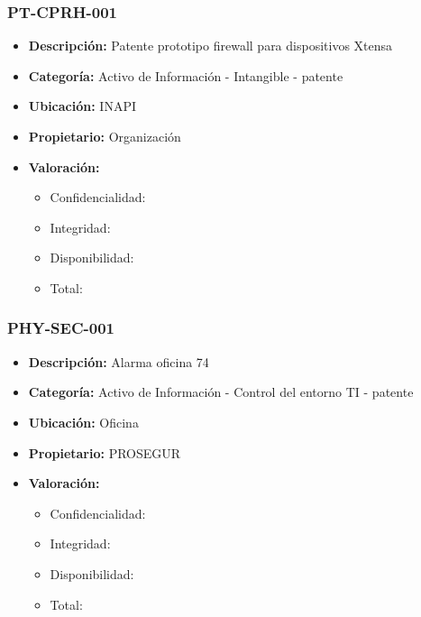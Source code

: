 \documentclass[11pt]{utalcaDoc}
\begin{document}
\subsubsection{PT-CPRH-001}
\begin{itemize}
    \item {\textbf{Descripción:}   Patente prototipo firewall para dispositivos Xtensa }
    \item {\textbf{Categoría:}     Activo de Información - Intangible - patente}
    \item {\textbf{Ubicación:}     INAPI }
    \item {\textbf{Propietario:}   Organización } %
    \item {\textbf{Valoración:}
          \begin{itemize}
              \item Confidencialidad:
              \item Integridad:
              \item Disponibilidad:
              \item Total:
          \end{itemize}
          }
\end{itemize}

\subsubsection{PHY-SEC-001}
\begin{itemize}
    \item {\textbf{Descripción:}   Alarma oficina 74 }
    \item {\textbf{Categoría:}     Activo de Información - Control del entorno TI - patente}
    \item {\textbf{Ubicación:}     Oficina }
    \item {\textbf{Propietario:}   PROSEGUR } %
    \item {\textbf{Valoración:}
          \begin{itemize}
              \item Confidencialidad:
              \item Integridad:
              \item Disponibilidad:
              \item Total:
          \end{itemize}
          }
\end{itemize}
\end{document}
